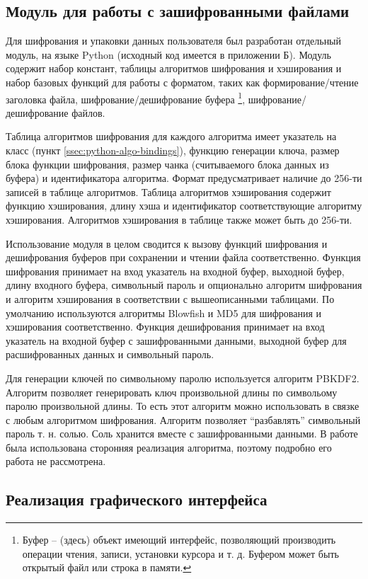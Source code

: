 \newpage
\subsection{Модуль для работы с зашифрованными файлами} %

Для шифрования и упаковки данных пользователя был разработан отдельный
модуль, на языке Python (исходный код имеется в приложении Б).
Модуль содержит набор констант, таблицы алгоритмов шифрования и хэширования
и набор базовых функций для работы с форматом, таких как формирование/чтение
заголовка файла, шифрование/дешифрование буфера
\footnote{Буфер -- (здесь) объект имеющий интерфейс, позволяющий производить
операции чтения, записи, установки курсора и т. д. Буфером может быть открытый
файл или строка в памяти.},
шифрование/дешифрование файлов.

Таблица алгоритмов шифрования для каждого алгоритма имеет
указатель на класс (пункт \ref{ssec:python-algo-bindings}),
функцию генерации ключа, размер блока функции шифрования,
размер чанка (считываемого блока данных из буфера) и идентификатора алгоритма.
Формат предусматривает наличие до 256-ти записей в таблице алгоритмов.
Таблица алгоритмов хэширования содержит функцию хэширования, длину хэша
и идентификатор соответствующие алгоритму хэширования. Алгоритмов хэширования
в таблице также может быть до 256-ти.

Использование модуля в целом сводится к вызову функций шифрования и
дешифрования буферов при сохранении и чтении файла соответственно.
Функция шифрования принимает на вход указатель на входной буфер,
выходной буфер, длину входного буфера, символьный пароль и опционально
алгоритм шифрования и алгоритм хэширования в соответствии с вышеописанными
таблицами. По умолчанию используются алгоритмы Blowfish и MD5 для
шифрования и хэширования соответственно.
Функция дешифрования принимает на вход указатель на входной буфер с
зашифрованными данными, выходной буфер для расшифрованных данных и
символьный пароль.

Для генерации ключей по символьному паролю используется алгоритм PBKDF2.
Алгоритм позволяет генерировать ключ произвольной длины по символьому
паролю произвольной длины. То есть этот алгоритм можно использовать в
связке с любым алгоритмом шифрования. Алгоритм позволяет ``разбавлять''
символьный пароль т. н. солью. Соль хранится вместе с зашифрованными данными.
В работе была использована сторонняя реализация алгоритма, поэтому
подробно его работа не рассмотрена.

\newpage
\subsection{Реализация графического интерфейса} %

